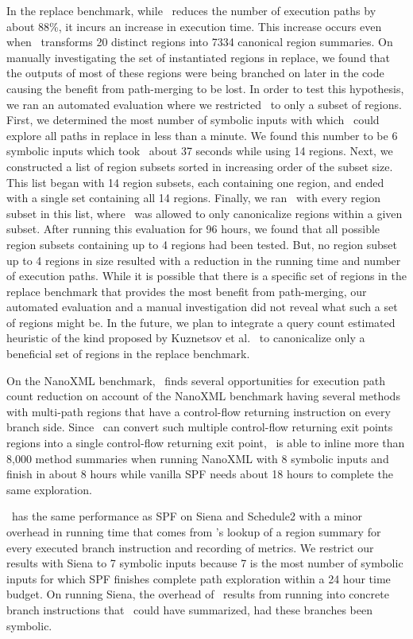 In the replace benchmark, while \tool\ reduces the number of execution paths by about 88\%, it incurs an increase in
execution time.
%
This increase occurs even when \tool\ transforms 20 distinct regions into 7334 canonical region summaries.
%
On manually investigating the set of instantiated regions in replace, we found that the outputs of most of these
regions were being branched on later in the code causing the benefit from path-merging to be lost.
%
In order to test this hypothesis, we ran an automated evaluation where we restricted \tool\ to only a subset of
regions.
%
First, we determined the most number of symbolic inputs with which \tool\ could explore all paths in replace in less
than a minute.
%
We found this number to be 6 symbolic inputs which took \tool\ about 37 seconds while using 14 regions.
%
Next, we constructed a list of region subsets sorted in increasing order of the subset size.
%
This list began with 14 region subsets, each containing one region, and ended with a single set containing all 14 regions.
%
Finally, we ran \tool\ with every region subset in this list, where \tool\ was allowed to only canonicalize regions
within a given subset.
%
After running this evaluation for 96 hours, we found that all possible region subsets containing up to 4 regions had
been tested.
%
But, no region subset up to 4 regions in size resulted with a reduction in the running time and number of execution
paths.
%
While it is possible that there is a specific set of regions in the replace benchmark that provides the most benefit
from path-merging, our automated evaluation and a manual investigation did not reveal what such a set of regions might be.
%
In the future, we plan to integrate a query count estimated heuristic of the kind proposed by
Kuznetsov et al.~\cite{kuznetsov} to canonicalize only a beneficial set of regions in the replace benchmark.

On the NanoXML benchmark, \tool\ finds several opportunities for execution path count reduction on account of the
NanoXML benchmark having several methods with multi-path regions that have a control-flow returning instruction on every
branch side.
%
Since \tool\ can convert such multiple control-flow returning exit points regions into a single control-flow
returning exit point, \tool\ is able to inline more than 8,000 method summaries when running NanoXML with 8 symbolic
inputs and finish in about 8 hours while vanilla SPF needs about 18 hours to complete the same exploration.

\tool\ has the same performance as SPF on Siena and Schedule2 with a minor overhead in running time that comes from
\tool\rq s lookup of a region summary for every executed branch instruction and recording of metrics.
%
We restrict our results with Siena to 7 symbolic inputs because 7 is the most number of symbolic inputs for which
SPF finishes complete path exploration within a 24 hour time budget.
%
On running Siena, the overhead of \tool\ results from running into concrete branch instructions that
\tool\ could have summarized, had these branches been symbolic.

